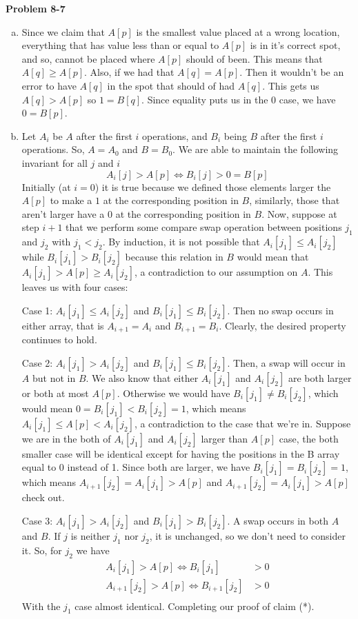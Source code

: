 \documentclass{article}
\begin{document}
\noindent\textbf{Problem 8-7}
\begin{enumerate}[a.]
\item
Since we claim that $A[p]$ is the smallest value placed at a wrong location, everything that has value less than or equal to $A[p]$ is in it's correct spot, and so, cannot be placed where $A[p]$ should of been. This means that $A[q] \ge A[p]$. Also, if we had that $A[q]=A[p]$. Then it wouldn't be an error to have $A[q]$ in the spot that should of had $A[q]$. This gets us $A[q] > A[p]$ so $1=B[q]$. Since equality puts us in the 0 case, we have $0=B[p]$.

\item

Let $A_i$ be $A$ after the first $i$ operations, and $B_i$ being $B$ after the first $i$ operations. So, $A=A_0$ and $B=B_0$. We are able to maintain the following invariant for all $j$ and $i$
\[
A_i[j]> A[p] \Leftrightarrow B_i[j]>0=B[p]\tag{*}
\]
Initially (at $i=0$) it is true because we defined those elements larger the $A[p]$ to make a $1$ at the corresponding position in $B$, similarly, those that aren't larger have a $0$ at the corresponding position in $B$. Now, suppose at step $i+1$ that we perform some compare swap operation between positions $j_1$ and $j_2$ with $j_1<j_2$. By induction, it is not possible that $A_i[j_1]\le A_i[j_2]$ while $B_i[j_1] >B_i[j_2]$ because this relation in $B$ would mean that $A_i[j_1] > A[p] \ge A_i[j_2]$, a contradiction to our assumption on $A$. This leaves us with four cases:

Case 1: $A_i[j_1]\le A_i[j_2]$ and $B_i[j_1] \le B_i[j_2]$. Then no swap occurs in either array, that is $A_{i+1} = A_{i}$ and $B_{i+1} = B_i$. Clearly, the desired property continues to hold.

Case 2: $A_i[j_1] > A_i[j_2]$ and $B_i[j_1] \le B_i[j_2]$. Then, a swap will occur in $A$ but not in $B$. We also know that either $A_i[j_1]$ and $A_i[j_2]$ are both larger or both at most $A[p]$. Otherwise we would have $B_i[j_1] \neq B_i[j_2]$, which would mean $0= B_i[j_1]  < B_i[j_2] =1$, which means $A_i[j_1] \le A[p] <A_i[j_2]$, a contradiction to the case that we're in. Suppose we are in the both of $A_i[j_1]$ and $A_i[j_2]$ larger than $A[p]$ case, the both smaller case will be identical except for having the positions in the B array equal to 0 instead of 1. Since both are larger, we have $B_i[j_1] = B_i[j_2]=1$, which means $A_{i+1}[j_2] = A_i[j_1] > A[p]$ and $A_{i+1}[j_2] = A_i[j_1] > A[p]$ check out.

Case 3: $A_i[j_1] > A_i[j_2]$ and $B_i[j_1] > B_i[j_2]$. A swap occurs in both $A$ and $B$. If $j$ is neither $j_1$ nor $j_2$, it is unchanged, so we don't need to consider it. So, for $j_2$ we have 
\begin{align*}
A_i[j_1]>A[p] \Leftrightarrow B_i[j_1] &> 0\\
A_{i+1}[j_2]>A[p] \Leftrightarrow B_{i+1}[j_2] &> 0\\
\end{align*}
With the $j_1$ case almost identical. Completing our proof of claim (*).


\end{enumerate}
\end{document}
